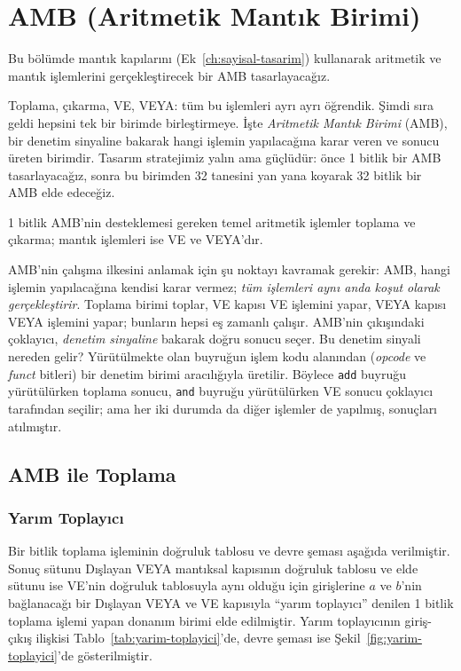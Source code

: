 \section{AMB (Aritmetik Mantık Birimi)}
\label{sec:amb}

Bu bölümde mantık kapılarını (Ek~\ref{ch:sayisal-tasarim}) kullanarak aritmetik ve mantık işlemlerini gerçekleştirecek bir AMB tasarlayacağız.

Toplama, çıkarma, VE, VEYA: tüm bu işlemleri ayrı ayrı öğrendik. Şimdi sıra geldi hepsini tek bir birimde birleştirmeye. İşte \emph{Aritmetik Mantık Birimi} (AMB), bir denetim sinyaline bakarak hangi işlemin yapılacağına karar veren ve sonucu üreten birimdir. Tasarım stratejimiz yalın ama güçlüdür: önce 1 bitlik bir AMB tasarlayacağız, sonra bu birimden 32 tanesini yan yana koyarak 32 bitlik bir AMB elde edeceğiz.

1 bitlik AMB'nin desteklemesi gereken temel aritmetik işlemler toplama ve çıkarma; mantık işlemleri ise VE ve VEYA'dır.

AMB'nin çalışma ilkesini anlamak için şu noktayı kavramak gerekir: AMB, hangi işlemin yapılacağına kendisi karar vermez; \emph{tüm işlemleri aynı anda koşut olarak gerçekleştirir}. Toplama birimi toplar, VE kapısı VE işlemini yapar, VEYA kapısı VEYA işlemini yapar; bunların hepsi eş zamanlı çalışır. AMB'nin çıkışındaki çoklayıcı, \emph{denetim sinyaline} bakarak doğru sonucu seçer. Bu denetim sinyali nereden gelir? Yürütülmekte olan buyruğun işlem kodu alanından (\emph{opcode} ve \emph{funct} bitleri) bir denetim birimi aracılığıyla üretilir. Böylece \texttt{add} buyruğu yürütülürken toplama sonucu, \texttt{and} buyruğu yürütülürken VE sonucu çoklayıcı tarafından seçilir; ama her iki durumda da diğer işlemler de yapılmış, sonuçları atılmıştır.

\subsection{AMB ile Toplama}

\subsubsection{Yarım Toplayıcı}

Bir bitlik toplama işleminin doğruluk tablosu ve devre şeması aşağıda verilmiştir. Sonuç sütunu Dışlayan VEYA mantıksal kapısının doğruluk tablosu ve elde sütunu ise VE'nin doğruluk tablosuyla aynı olduğu için girişlerine $a$ ve $b$'nin bağlanacağı bir Dışlayan VEYA ve VE kapısıyla ``yarım toplayıcı'' denilen 1 bitlik toplama işlemi yapan donanım birimi elde edilmiştir. Yarım toplayıcının giriş-çıkış ilişkisi Tablo~\ref{tab:yarim-toplayici}'de, devre şeması ise Şekil~\ref{fig:yarim-toplayici}'de gösterilmiştir.

